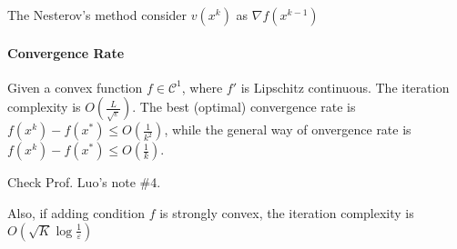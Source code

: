 The Nesterov's method consider $v(x^k)$ as $\nabla f(x^{k-1})$

\paragraph{Convergence Rate}
Given a convex function $f\in\mathcal{C}^1$, where $f'$ is Lipschitz continuous. The iteration complexity is $O(\frac{L}{\sqrt{\varepsilon}})$. The best (optimal) convergence rate is $f(x^k) - f(x^*)\le O(\frac{1}{k^2})$, while the general way of onvergence rate is $f(x^k) - f(x^*)\le O(\frac{1}{k})$.

Check Prof. Luo's note $\#$4.

Also, if adding condition $f$ is strongly convex, the iteration complexity is $O(\sqrt{K}\log\frac{1}{\varepsilon})$













